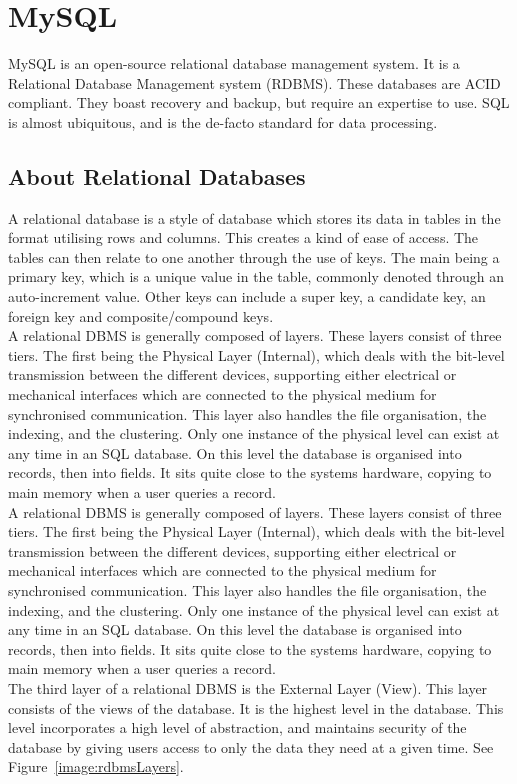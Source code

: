 \section{MySQL}
MySQL is an open-source relational database management system. It is a Relational Database Management system (RDBMS). These databases are ACID compliant. They boast recovery and backup, but require an expertise to use. SQL is almost ubiquitous, and is the de-facto standard for data processing. 

\subsection{About Relational Databases}
\label{rdbms}
A relational database is a style of database which stores its data in tables in the format utilising rows and columns. This creates a kind of ease of access. The tables can then relate to one another through the use of keys. The main being a primary key, which is a unique value in the table, commonly denoted through an auto-increment value. Other keys can include a super key, a candidate key, an foreign key and composite/compound keys. 
\\A relational DBMS is generally composed of layers. These layers consist of three tiers. The first being the Physical Layer (Internal), which deals with the bit-level transmission between the different devices, supporting either electrical or mechanical interfaces which are connected to the physical medium for synchronised communication. This layer also handles the file organisation, the indexing, and the clustering. Only one instance of the physical level can exist at any time in an SQL database. On this level the database is organised into records, then into fields. It sits quite close to the systems hardware, copying to main memory when a user queries a record.
\\A relational DBMS is generally composed of layers. These layers consist of three tiers. The first being the Physical Layer (Internal), which deals with the bit-level transmission between the different devices, supporting either electrical or mechanical interfaces which are connected to the physical medium for synchronised communication. This layer also handles the file organisation, the indexing, and the clustering. Only one instance of the physical level can exist at any time in an SQL database. On this level the database is organised into records, then into fields. It sits quite close to the systems hardware, copying to main memory when a user queries a record.
\\The third layer of a relational DBMS is the External Layer (View). This layer consists of the views of the database. It is the highest level in the database. This level incorporates a high level of abstraction, and maintains security of the database by giving users access to only the data they need at a given time.
See Figure~\ref{image:rdbmsLayers}.

